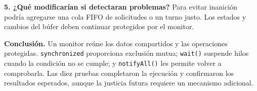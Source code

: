 \documentclass[12pt]{report}
\begin{document}
\textbf{5. ¿Qué modificarían si detectaran problemas?} Para evitar inanición podría agregarse una cola FIFO de solicitudes o un turno justo. Los estados y cambios del búfer deben continuar protegidos por el monitor.

\textbf{Conclusión.} Un monitor reúne los datos compartidos y las operaciones protegidas. \texttt{synchronized} proporciona exclusión mutua; \texttt{wait()} suspende hilos cuando la condición no se cumple; y \texttt{notifyAll()} les permite volver a comprobarla. Las diez pruebas completaron la ejecución y confirmaron los resultados esperados, aunque la justicia futura requiere un mecanismo adicional.
\end{document}

